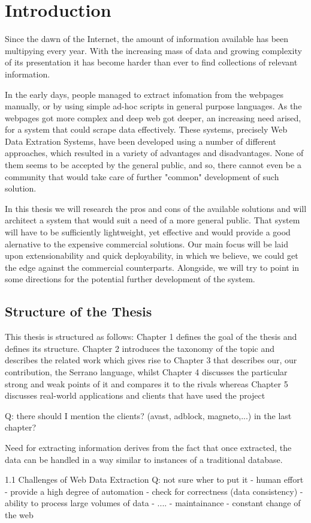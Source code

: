 \chapter*{Introduction}

Since the dawn of the Internet, the amount of information available has been multipying every year.
With the increasing mass of data and growing complexity of its presentation it has become harder than ever to find collections of relevant information.

In the early days, people managed to extract infomation from the webpages manually,
 or by using simple ad-hoc scripts in general purpose languages.
As the webpages got more complex and deep web got deeper, 
 an increasing need arised, for a system that could scrape data effectively.
These systems, precisely Web Data Extration Systems, have been developed
 using a number of different approaches, which resulted 
in a variety of advantages and disadvantages. 
None of them seems to be accepted by the general public, and so, there cannot even be a community that would 
take care of further "common" development of such solution.


In this thesis we will research the pros and cons of the available solutions and will architect a system that would suit a need of a more general public.
That system will have to be sufficiently lightweight, yet effective and would provide a good alernative to 
the expensive commercial solutions. Our main focus will be laid upon extensionability and quick deployability, 
in which we believe, we could get the edge against the commercial counterparts. 
Alongside, we will try to point in some directions for the potential further development of the system.

\section{Structure of the Thesis}
This thesis is structured as follows:
Chapter 1 defines the goal of the thesis and defines its structure.
Chapter 2 introduces the taxonomy of the topic and describes the related work which gives rise to
Chapter 3 that describes our, our contribution, the Serrano language, whilst
Chapter 4 discusses the particular strong and weak points of it and compares it to the rivals whereas
Chapter 5 discusses real-world applications and clients that have used the project 

Q: there should I mention the clients? (avast, adblock, magneto,...) in the last chapter?




Need for extracting information derives from the fact that once extracted, the data can be handled in a way similar to instances of a traditional database.

1.1 Challenges of Web Data Extraction
Q: not sure wher to put it
- human effort - provide a high degree of automation
- check for correctness (data consistency)
- ability to process large volumes of data
- ....
- maintainance - constant change of the web